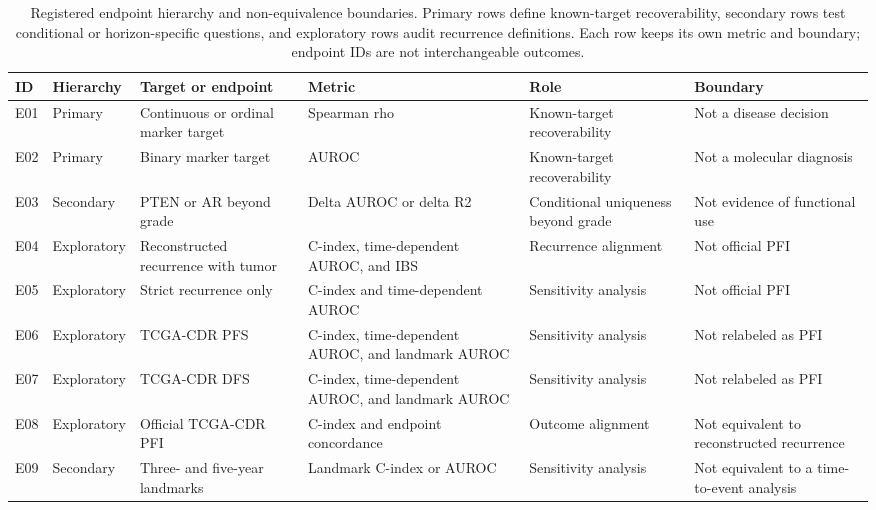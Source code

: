 \begin{table}[H]
\centering
\scriptsize
\caption{Registered endpoint hierarchy and non-equivalence boundaries. Primary rows define known-target recoverability, secondary rows test conditional or horizon-specific questions, and exploratory rows audit recurrence definitions. Each row keeps its own metric and boundary; endpoint IDs are not interchangeable outcomes.}
\label{tab:supp-endpoints}
\begin{tabular}{@{}p{}p{}p{}p{}p{}p{}@{}}
\toprule
ID & Hierarchy & Target or endpoint & Metric & Role & Boundary \\
\midrule
E01 & Primary & Continuous or ordinal marker target & Spearman rho & Known-target recoverability & Not a disease decision \\
E02 & Primary & Binary marker target & AUROC & Known-target recoverability & Not a molecular diagnosis \\
E03 & Secondary & PTEN or AR beyond grade & Delta AUROC or delta R2 & Conditional uniqueness beyond grade & Not evidence of functional use \\
E04 & Exploratory & Reconstructed recurrence with tumor & C-index, time-dependent AUROC, and IBS & Recurrence alignment & Not official PFI \\
E05 & Exploratory & Strict recurrence only & C-index and time-dependent AUROC & Sensitivity analysis & Not official PFI \\
E06 & Exploratory & TCGA-CDR PFS & C-index, time-dependent AUROC, and landmark AUROC & Sensitivity analysis & Not relabeled as PFI \\
E07 & Exploratory & TCGA-CDR DFS & C-index, time-dependent AUROC, and landmark AUROC & Sensitivity analysis & Not relabeled as PFI \\
E08 & Exploratory & Official TCGA-CDR PFI & C-index and endpoint concordance & Outcome alignment & Not equivalent to reconstructed recurrence \\
E09 & Secondary & Three- and five-year landmarks & Landmark C-index or AUROC & Sensitivity analysis & Not equivalent to a time-to-event analysis \\
\bottomrule
\end{tabular}
\end{table}
